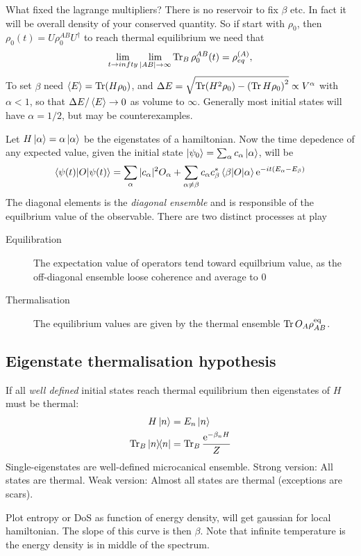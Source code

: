 \documentclass[a4paper]{article}
\begin{document}
What fixed the lagrange multipliers? There is no reservoir to fix $\beta$ etc.
In fact it will be overall density of your conserved quantity. So if start with
$\rho_0$, then $\rho_0(t)=U\rho_0^{AB} U^\dagger$ to reach thermal equilibrium
we need that 
\[ \lim_{t\to infty}\lim_{|AB|\to\infty} \operatorname{Tr}_B \rho_0^{AB}(t)=\rho_{eq}^{(A)},
\]
To set $\beta$ need $\braket{E}=\operatorname{Tr}(H\rho_0)$, and $\Delta E
=\sqrt{\operatorname{Tr}(H^2\rho_0)-\left(\operatorname{Tr} H\rho_0\right)^2}\propto V^\alpha$ with
$\alpha<1$, so that $\Delta E/\braket{E}\to 0$ as volume to $\infty$. Generally
most initial states will have $\alpha=1/2$, but may be counterexamples.

\begin{example}
    Let $H\ket{\alpha}=\alpha\ket{\alpha}$ be the eigenstates of a hamiltonian.
    Now the time depedence of any expected value, given the initial state
    $\ket{\psi_0}=\sum_\alpha c_\alpha \ket{\alpha}$, will be 
    \[
    \braket{\psi(t)|O|\psi(t)}=\sum_\alpha |c_\alpha|^2 O_\alpha
    +\sum_{\alpha\neq\beta} c_\alpha c^*_\beta \braket{\beta|O|\alpha}
    \mathrm{e}^{-i t(E_\alpha-E_\beta)}
    \]
    The diagonal elements is the \emph{diagonal ensemble} and is responsible of
    the equilbrium value of the observable. There are two distinct processes at
    play
    \begin{description}
        \item[Equilibration] The expectation value of operators tend toward
            equilbrium value, as the off-diagonal ensemble loose coherence and
            average to 0
        \item[Thermalisation] The equilibrium values are given by the thermal
            ensemble $\operatorname{Tr} O_A\rho_{AB}^\mathrm{eq}$.
    \end{description}
\end{example}
\subsection{Eigenstate thermalisation hypothesis}
If all \emph{well defined} initial states reach thermal equilibrium then
eigenstates of $H$ must be thermal:
\begin{align*}
    H\ket{n}&=E_n\ket{n}\\
    \operatorname{Tr}_B\ket{n}\!\!\bra{n} &=\operatorname{Tr}_B \frac{\mathrm{e}^{-\beta_n H}}{Z}
\end{align*}
Single-eigenstates are well-defined microcanical ensemble. 
Strong version: All states are thermal.
Weak version: Almost all states are thermal (exceptions are scars).
\begin{example}
    Plot entropy or DoS  as function of energy density, will get gaussian for
    local hamiltonian. The slope of this curve is then $\beta$. Note that
    infinite temperature is the energy density is in  middle of the spectrum.
\end{example}
\end{document}

